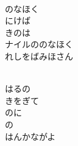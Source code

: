\documentclass[10pt,b5j]{tarticle} %
\begin{document}
\begin{enumerate}
\begin{minipage}[c]{\blocksize}
    \end{minipage}
    \begin{minipage}[c]{\blocksize}
        
        \vspace{\linespace}
        \item~\\
        のなほく\\
        にけば\\
        きのは\\
        ナイルののなほく\\
        れしをばみほさん
        
    \end{minipage}
    \begin{minipage}[c]{\blocksize}
        
        \vspace{\linespace}
        \item~\\
        はるの\\
        きをぎて\\
        のに\\
        の\\
        はんかながよ
    
    \end{minipage}
\end{enumerate} %
\end{document}
